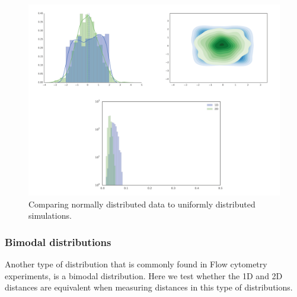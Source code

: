 \begin{figure}[htbp]
\centering
\includegraphics[scale=0.6]{chapterABCFlow/images/uni_v_normal.png}
\caption{Comparing normally distributed data to uniformly distributed simulations.}
\label{fig:epsilon_uni_v_normal}
\end{figure}
\clearpage


 \subsubsection{Bimodal distributions}
Another type of distribution that is commonly found in Flow cytometry experiments, is a bimodal distribution. Here we test whether the 1D and 2D distances are equivalent when measuring distances in this type of distributions.

